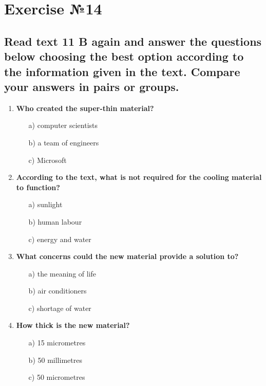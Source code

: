 \section{Exercise №14}
\subsection*{Read text 11 B again and answer the questions below choosing the best option according
      to the information given in the text. Compare your answers in pairs or groups.}

\begin{enumerate}
      \item \textbf{Who created the super-thin material?}
            \begin{enumerate}
                  \item[a)] computer scientists
                  \item[b)] a team of engineers
                  \item[c)] Microsoft
            \end{enumerate}
      \item \textbf{According to the text, what is not required for the cooling material to function?}
            \begin{enumerate}
                  \item[a)] sunlight
                  \item[b)] human labour
                  \item[c)] energy and water
            \end{enumerate}
      \item \textbf{What concerns could the new material provide a solution to?}
            \begin{enumerate}
                  \item[a)] the meaning of life
                  \item[b)] air conditioners
                  \item[c)] shortage of water
            \end{enumerate}
      \item \textbf{How thick is the new material?}
            \begin{enumerate}
                  \item[a)] 15 micrometres
                  \item[b)] 50 millimetres
                  \item[c)] 50 micrometres
            \end{enumerate}

\end{enumerate}
